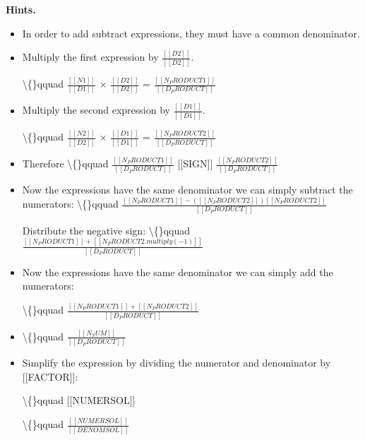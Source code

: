 \documentclass{article}
\begin{document}
\textbf{Hints.}
\begin{itemize}
  \item In order to
                add
                subtract
                expressions, they must have a common denominator.
  \item Multiply the first expression by $\frac{[[D2]]}{[[D2]]}$.

                 \textbackslash\{\}qquad
                    $\frac{[[N1]]}{[[D1]]}$ $\times$ $\frac{[[D2]]}{[[D2]]}$ = 
                    $\frac{[[N_PRODUCT1]]}{[[D_PRODUCT]]}$
  \item Multiply the second expression by $\frac{[[D1]]}{[[D1]]}$.

                 \textbackslash\{\}qquad
                    $\frac{[[N2]]}{[[D2]]}$ $\times$ $\frac{[[D1]]}{[[D1]]}$ = 
                    $\frac{[[N_PRODUCT2]]}{[[D_PRODUCT]]}$
  \item Therefore
                 \textbackslash\{\}qquad
                    $\frac{[[N_PRODUCT1]]}{[[D_PRODUCT]]}$ [[SIGN]] 
                    $\frac{[[N_PRODUCT2]]}{[[D_PRODUCT]]}$
  \item Now the expressions have the same denominator we can simply subtract the numerators:
                    \textbackslash\{\}qquad 
                        $\frac{[[N_PRODUCT1]] - 
                            ([[N_PRODUCT2]])
                            [[N_PRODUCT2]]
                        }{[[D_PRODUCT]]}$
                    
                

                
                    
                        Distribute the negative sign:
                        \textbackslash\{\}qquad $\frac{[[N_PRODUCT1]] + [[N_PRODUCT2.multiply(-1)]]}{[[D_PRODUCT]]}$
  \item Now the expressions have the same denominator we can simply add the numerators:
                
                    \textbackslash\{\}qquad $\frac{[[N_PRODUCT1]] + [[N_PRODUCT2]]}{[[D_PRODUCT]]}$
  \item \textbackslash\{\}qquad $\frac{[[N_SUM]]}{[[D_PRODUCT]]}$
  \item Simplify the expression by dividing the numerator and denominator by [[FACTOR]]:
                
                    \textbackslash\{\}qquad [[NUMERSOL]]
                
                
                    \textbackslash\{\}qquad $\frac{[[NUMERSOL]]}{[[DENOMSOL]]}$
\end{itemize}
\end{document}
